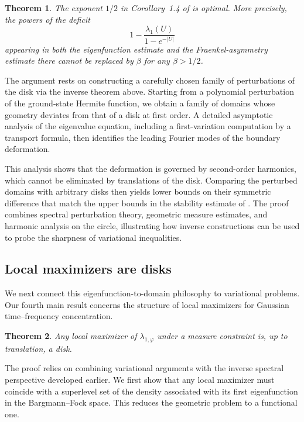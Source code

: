 \documentclass[a4paper,11pt,reqno]{amsart}
\numberwithin{equation}{section}
\theoremstyle{plain} %
\newtheorem{theorem}{Theorem}
\theoremstyle{definition} %
\theoremstyle{remark}
\begin{document}
\begin{theorem} \label{thm:GGRT-sharp}
The exponent $1/2$ in Corollary~1.4 of \cite{Gomez-Guerra-Ramos-Tilli} is optimal. More precisely, the powers of the deficit
\[
1-\frac{\lambda_1(U)}{1-e^{-|U|}}
\]
appearing in both the eigenfunction estimate and the Fraenkel-asymmetry estimate there cannot be replaced by $\beta$ for any $\beta>1/2$.
\end{theorem}

The argument rests on constructing a carefully chosen family of perturbations of the disk via the inverse theorem above. Starting from a polynomial perturbation of the ground-state Hermite function, we obtain a family of domains whose geometry deviates from that of a disk at first order. A detailed asymptotic analysis of the eigenvalue equation, including a first-variation computation by a transport formula, then identifies the leading Fourier modes of the boundary deformation.

This analysis shows that the deformation is governed by second-order harmonics, which cannot be eliminated by translations of the disk. Comparing the perturbed domains with arbitrary disks then yields lower bounds on their symmetric difference that match the upper bounds in the stability estimate of \cite{Gomez-Guerra-Ramos-Tilli}. The proof combines spectral perturbation theory, geometric measure estimates, and harmonic analysis on the circle, illustrating how inverse constructions can be used to probe the sharpness of variational inequalities.

\subsection{Local maximizers are disks}

We next connect this eigenfunction-to-domain philosophy to variational problems. Our fourth main result concerns the structure of local maximizers for Gaussian time--frequency concentration.

\begin{theorem}\label{thm:local-maximizers}
Any local maximizer of $\lambda_{1,\varphi}$ under a measure constraint is, up to translation, a disk.
\end{theorem}

The proof relies on combining variational arguments with the inverse spectral perspective developed earlier. We first show that any local maximizer must coincide with a superlevel set of the density associated with its first eigenfunction in the Bargmann--Fock space. This reduces the geometric problem to a functional one.
\end{document}

